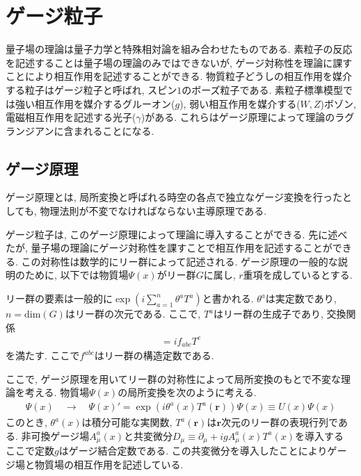 \section{ゲージ粒子}
量子場の理論は量子力学と特殊相対論を組み合わせたものである.
素粒子の反応を記述することは量子場の理論のみではできないが, ゲージ対称性を理論に課すことにより相互作用を記述することができる.
物質粒子どうしの相互作用を媒介する粒子はゲージ粒子と呼ばれ, スピン$1$のボーズ粒子である.
素粒子標準模型では強い相互作用を媒介するグルーオン($g$), 弱い相互作用を媒介する($W, Z$)ボゾン, 電磁相互作用を記述する光子($\gamma$)がある.
これらはゲージ原理によって理論のラグランジアンに含まれることになる.
\subsection{ゲージ原理}
ゲージ原理とは, 局所変換と呼ばれる時空の各点で独立なゲージ変換を行ったとしても, 物理法則が不変でなければならない主導原理である.

ゲージ粒子は, このゲージ原理によって理論に導入することができる.
先に述べたが, 量子場の理論にゲージ対称性を課すことで相互作用を記述することができる.
この対称性は数学的にリー群によって記述される.
ゲージ原理の一般的な説明のために, 以下では物質場$\Psi(x)$がリー群$G$に属し, $r$重項を成しているとする.

リー群の要素は一般的に$\exp\left(i\sum_{a=1}^n \theta^a T^a\right)$と書かれる.
$\theta^a$は実定数であり, $n=\mathrm{dim}(G)$はリー群の次元である.
ここで, $T^a$はリー群の生成子であり, 交換関係
\begin{align}
  [T^a, T^b] = if_{abc}T^c \label{gauge-1}
\end{align}
を満たす.
ここで$f^{abc}$はリー群の構造定数である.

ここで, ゲージ原理を用いてリー群の対称性によって局所変換のもとで不変な理論を考える.
物質場$\Psi(x)$の局所変換を次のように考える.
\begin{align}
  \Psi(x)\quad\rightarrow\quad\Psi(x)' = \exp\left(i\theta^a(x)T^a(\bm{r})\right)\Psi(x) \equiv U(x)\Psi(x) \label{gauge-2}
\end{align}
このとき, $\theta^a(x)$は積分可能な実関数, $T^a(\bm{r})$は$\bm{r}$次元のリー群の表現行列である.
非可換ゲージ場$A^a_\mu(x)$と共変微分$D_\mu\equiv\partial_\mu+ig A^a_\mu(x)T^a(x)$を導入する
ここで定数$g$はゲージ結合定数である.
この共変微分を導入したことによりゲージ場と物質場の相互作用を記述している.

